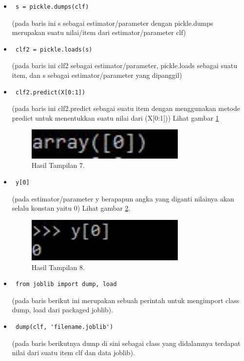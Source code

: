 \begin{itemize}
\item\begin{verbatim} s = pickle.dumps(clf)\end{verbatim}(pada baris ini s sebagai estimator/parameter dengan pickle.dumps merupakan suatu nilai/item dari estimator/parameter clf)
\item\begin{verbatim} clf2 = pickle.loads(s)\end{verbatim}(pada baris ini clf2 sebagai estimator/parameter, pickle.loads sebagai suatu item, dan s sebagai estimator/parameter yang dipanggil) 
\item\begin{verbatim} clf2.predict(X[0:1])\end{verbatim}(pada baris ini clf2.predict sebagai suatu item dengan menggunakan metode predict untuk menentukkan suatu nilai dari (X[0:1])) Lihat gambar \ref{16}
\begin{figure}[!htbp]\centerline{\includegraphics[width=0.75\textwidth]{figures/huda/16.JPG}}\caption{Hasil Tampilan 7.}\label{16}\end{figure}
\item\begin{verbatim} y[0]\end{verbatim}(pada estimator/parameter y berapapun angka yang diganti nilainya akan selalu konstan yaitu 0) Lihat gambar \ref{17}.
\begin{figure}[!htbp]\centerline{\includegraphics[width=0.75\textwidth]{figures/huda/17.JPG}}\caption{Hasil Tampilan 8.}\label{17}\end{figure}
\item\begin{verbatim} from joblib import dump, load\end{verbatim}(pada baris berikut ini merupakan sebuah perintah untuk mengimport class dump, load dari packaged joblib).
\item\begin{verbatim} dump(clf, 'filename.joblib')\end{verbatim}(pada baris berikutnya dump di sini sebagai class yang didalamnya terdapat nilai dari suatu item clf dan data joblib).

\end{itemize}
